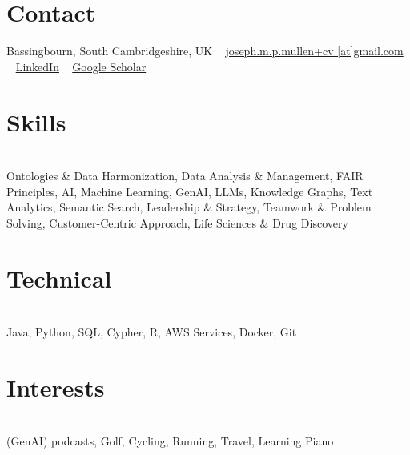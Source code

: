 \documentclass[print]{cv-style}          %
\begin{document}
\lastupdated


\begin{aside}
%
\section{Contact}
Bassingbourn,
South Cambridgeshire,
UK
~
\href{mailto:joseph.m.p.mullen+cv@gmail.com}{joseph.m.p.mullen+cv
[at]gmail.com}
~
\href{https://www.linkedin.com/in/joseph-mullen-9112a44b/}{LinkedIn}
~
\href{https://scholar.google.com/citations?user=bIkPW0YAAAAJ&hl=en}{Google Scholar}
%
\section{Skills}\\Ontologies \& Data Harmonization, Data Analysis \& Management, FAIR Principles, AI, Machine Learning, GenAI, LLMs, Knowledge Graphs, Text Analytics, Semantic Search, Leadership \& Strategy, Teamwork \& Problem Solving, Customer-Centric Approach, Life Sciences \& Drug Discovery
\section{Technical} \\Java,
Python, SQL, Cypher, R, AWS Services, Docker, Git
\section{Interests}\\(GenAI) podcasts, Golf, Cycling, Running, Travel, Learning Piano
%
\end{aside}
\end{document}
